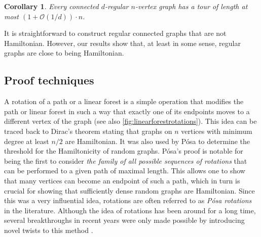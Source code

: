 \documentclass[11pt]{article}
\theoremstyle{plain}
\newtheorem{corollary}[theorem]{Corollary}
\theoremstyle{definition}
\newcommand{\cO}{\mathcal O}
\begin{document}
\begin{corollary}
    Every connected $d$-regular $n$-vertex graph has a tour of length at most $(1+\cO(1/d)) \cdot n$. 
\end{corollary}

It is straightforward to construct regular connected graphs that are not Hamiltonian. However, our results show that, at least in some sense, regular graphs are close to being Hamiltonian. 

\subsection{Proof techniques}\label{ssec:prooftechniques}

A rotation of a path or a linear forest is a simple operation that modifies the path or linear forest in such a way that exactly one of its endpoints moves to a different vertex of the graph (see also \cref{fig:linearforestrotations}). This idea can be traced back to Dirac's theorem \cite{dirac1952some} stating that graphs on $n$ vertices with minimum degree at least $n/2$ are Hamiltonian. It was also used by P\'osa \cite{posa1976hamiltonian} to determine the threshold for the Hamiltonicity of random graphs. P\'osa's proof is notable for being the first to consider \textit{the family of all possible sequences of rotations} that can be performed to a given path of maximal length. This allows one to show that many vertices can become an endpoint of such a path, which in turn is crucial for showing that sufficiently dense random graphs are Hamiltonian. Since this was a very influential idea, rotations are often referred to as \emph{P\'osa rotations} in the literature. Although the idea of rotations has been around for a long time, several breakthroughs in recent years were only made possible by introducing novel twists to this method \cite{glock2024hamilton, draganic2024pancyclicity, draganic2024hamiltonicity}.
\end{document}
